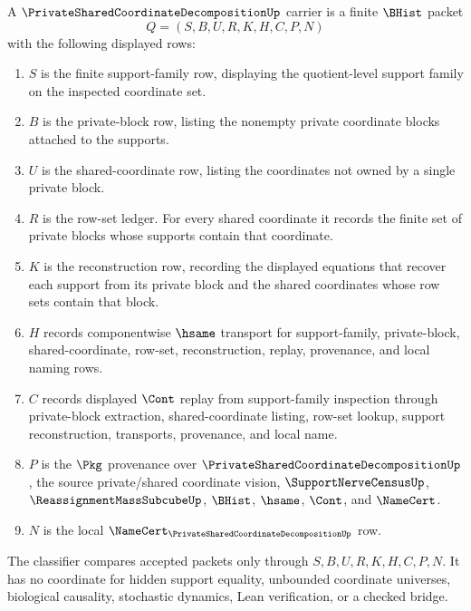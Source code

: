 \begin{definition}
\label{def:private-shared-coordinate-decomposition-carrier}
A $\PrivateSharedCoordinateDecompositionUp$ carrier is a finite $\BHist$ packet
$$
Q=(S,B,U,R,K,H,C,P,N)
$$
with the following displayed rows:
\begin{enumerate}
\item $S$ is the finite support-family row, displaying the quotient-level support family on the inspected coordinate set.
\item $B$ is the private-block row, listing the nonempty private coordinate blocks attached to the supports.
\item $U$ is the shared-coordinate row, listing the coordinates not owned by a single private block.
\item $R$ is the row-set ledger. For every shared coordinate it records the finite set of private blocks whose supports contain that coordinate.
\item $K$ is the reconstruction row, recording the displayed equations that recover each support from its private block and the shared coordinates whose row sets contain that block.
\item $H$ records componentwise $\hsame$ transport for support-family, private-block, shared-coordinate, row-set, reconstruction, replay, provenance, and local naming rows.
\item $C$ records displayed $\Cont$ replay from support-family inspection through private-block extraction, shared-coordinate listing, row-set lookup, support reconstruction, transports, provenance, and local name.
\item $P$ is the $\Pkg$ provenance over $\PrivateSharedCoordinateDecompositionUp$, the source private/shared coordinate vision, $\SupportNerveCensusUp$, $\ReassignmentMassSubcubeUp$, $\BHist$, $\hsame$, $\Cont$, and $\NameCert$.
\item $N$ is the local $\NameCert_{\PrivateSharedCoordinateDecompositionUp}$ row.
\end{enumerate}
The classifier compares accepted packets only through $S,B,U,R,K,H,C,P,N$. It has no coordinate for hidden support equality, unbounded coordinate universes, biological causality, stochastic dynamics, Lean verification, or a checked bridge.
\end{definition}

